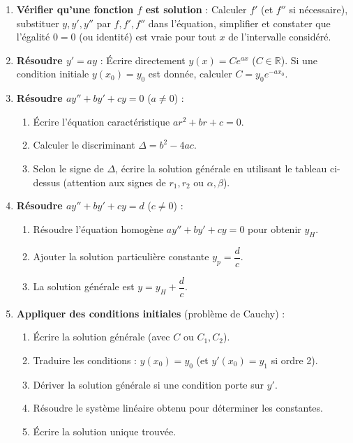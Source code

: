 \documentclass[11pt]{article}
\newcommand{\cle}[1]{{\popxbold\color{popdark}#1}}
\begin{document}
\begin{methode}
\begin{enumerate}
  \item \textbf{Vérifier qu'une fonction $f$ est solution} : Calculer $f'$ (et $f''$ si nécessaire), substituer $y, y', y''$ par $f, f', f''$ dans l'équation, simplifier et constater que l'égalité $0=0$ (ou identité) est vraie pour tout $x$ de l'intervalle considéré.
  \item \textbf{Résoudre $y' = ay$} : Écrire directement $y(x) = C e^{ax}$ ($C \in \mathbb{R}$). Si une condition initiale $y(x_0)=y_0$ est donnée, calculer $C = y_0 e^{-ax_0}$.
  \item \textbf{Résoudre $ay'' + by' + cy = 0$} ($a \neq 0$) :
        \begin{enumerate}
          \item Écrire l'équation caractéristique $ar^2 + br + c = 0$.
          \item Calculer le discriminant $\Delta = b^2 - 4ac$.
          \item Selon le signe de $\Delta$, écrire la solution générale en utilisant le tableau ci-dessus (attention aux signes de $r_1, r_2$ ou $\alpha, \beta$).
        \end{enumerate}
  \item \textbf{Résoudre $ay'' + by' + cy = d$} ($c \neq 0$) :
        \begin{enumerate}
          \item Résoudre l'équation homogène $ay''+by'+cy=0$ pour obtenir $y_H$.
          \item Ajouter la solution particulière constante $y_p = \dfrac{d}{c}$.
          \item La solution générale est $y = y_H + \dfrac{d}{c}$.
        \end{enumerate}
  \item \textbf{Appliquer des conditions initiales} (problème de Cauchy) :
        \begin{enumerate}
          \item Écrire la solution générale (avec $C$ ou $C_1, C_2$).
          \item Traduire les conditions : $y(x_0) = y_0$ (et $y'(x_0) = y_1$ si ordre 2).
          \item Dériver la solution générale si une condition porte sur $y'$.
          \item Résoudre le système linéaire obtenu pour déterminer les constantes.
          \item Écrire la solution \cle{unique} trouvée.

\end{enumerate}
\end{enumerate}
\end{methode}
\end{document}
